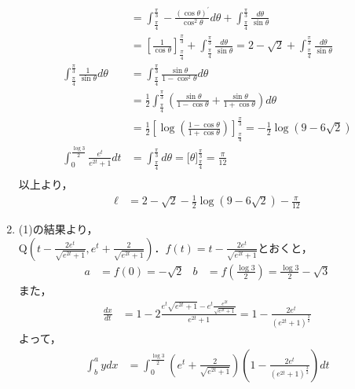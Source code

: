 \documentclass[a3paper,twocolumn,fleqn]{ltjsarticle}
\begin{document}
\begin{enumerate}[(1)]
\begin{align*}
        &= \int^{\frac{\pi}{3}}_{\frac{\pi}{4}} -\frac{\left(\cos\theta\right)^\prime}{\cos^2\theta} d\theta + \int^{\frac{\pi}{3}}_{\frac{\pi}{4}} \frac{d\theta}{\sin\theta}\\
        &= \left[\frac{1}{\cos\theta}\right]^{\frac{\pi}{3}}_{\frac{\pi}{4}} + \int^{\frac{\pi}{3}}_{\frac{\pi}{4}} \frac{d\theta}{\sin\theta} = 2 -\sqrt{2} + \int^{\frac{\pi}{3}}_{\frac{\pi}{4}} \frac{d\theta}{\sin\theta}\\
        \int^{\frac{\pi}{3}}_{\frac{\pi}{4}} \frac{1}{\sin\theta} d\theta  &= \int^{\frac{\pi}{3}}_{\frac{\pi}{4}} \frac{\sin\theta}{1-\cos^2\theta} d\theta\\
        &= \frac{1}{2}\int^{\frac{\pi}{3}}_{\frac{\pi}{4}} \left(\frac{\sin\theta}{1-\cos\theta}+\frac{\sin\theta}{1+\cos\theta}\right) d\theta\\
        &= \frac{1}{2}\left[\log\left(\frac{1-\cos\theta}{1+\cos\theta}\right)\right]^{\frac{\pi}{3}}_{\frac{\pi}{4}} = -\frac{1}{2}\log\left(9-6\sqrt{2}\right)\\
        \int_{0}^{\frac{\log3}{2}} \frac{e^t}{e^{2t}+1} dt &= \int^{\frac{\pi}{3}}_{\frac{\pi}{4}} d\theta = \Big[\theta\Big]^{\frac{\pi}{3}}_{\frac{\pi}{4}} = \frac{\pi}{12}\\
    \end{align*}
    以上より，
    \begin{align*}
        \ell &= 2 -\sqrt{2} -\frac{1}{2}\log\left(9-6\sqrt{2}\right) - \frac{\pi}{12}
    \end{align*}
    \item (1)の結果より，\\
    Q$\displaystyle \left( t - \frac{2e^t}{\sqrt{e^{2t}+1}} , e^t + \frac{2}{\sqrt{e^{2t}+1}}\right)$．$\displaystyle f(t) = t - \frac{2e^t}{\sqrt{e^{2t}+1}}$とおくと， \\
    \begin{align*}
        a & = f(0) = -\sqrt{2} & b & = f\left(\frac{\log3}{2}\right) = \frac{\log3}{2}-\sqrt{3}
    \end{align*}
    また，
    \begin{align*}
        \frac{dx}{dt} &= 1-2\frac{e^t \sqrt{e^{2t}+1} - e^t \frac{e^{2t}}{\sqrt{e^{2t}+1}}}{e^{2t}+1} = 1-\frac{2e^t}{{\left( e^{2t}+1 \right)}^\frac{3}{2}}
    \end{align*}
    よって，
    \begin{align*}
        \int_{b}^{a} y dx &= \int_{0}^{\frac{\log3}{2}} \left( e^t + \frac{2}{\sqrt{e^{2t}+1}}\right)\left( 1-\frac{2e^t}{{\left( e^{2t}+1 \right)}^\frac{3}{2}} \right) dt \\

\end{align*}
\end{enumerate}
\end{document}
